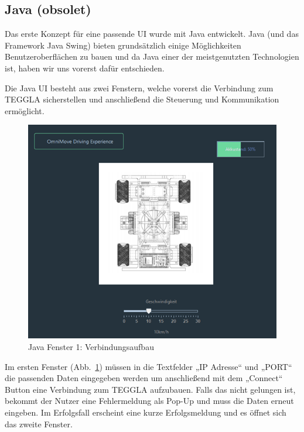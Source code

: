 \subsection{Java (obsolet)}
Das erste Konzept für eine passende UI wurde mit Java entwickelt. 
Java (und das Framework Java Swing) bieten grundsätzlich einige Möglichkeiten Benutzeroberflächen zu bauen und da Java einer der meistgenutzten Technologien ist, haben wir uns vorerst dafür entschieden.

Die Java UI besteht aus zwei Fenstern, welche vorerst die Verbindung zum TEGGLA sicherstellen und anschließend die Steuerung und Kommunikation ermöglicht. 

\begin{figure}[!ht]
	\centering
	\includegraphics[width=\textwidth]{bilder/java1.png}
	\caption{Java Fenster 1: Verbindungsaufbau}
	\label{bild:java1}
\end{figure}


Im ersten Fenster (Abb.~\ref{bild:java1}) müssen in die Textfelder „IP Adresse“ und „PORT“ die passenden Daten eingegeben werden um anschließend mit dem „Connect“ Button eine Verbindung zum TEGGLA aufzubauen. 
Falls das nicht gelungen ist, bekommt der Nutzer eine Fehlermeldung als Pop-Up und muss die Daten erneut eingeben. 
Im Erfolgsfall erscheint eine kurze Erfolgsmeldung und es öffnet sich das zweite Fenster.

